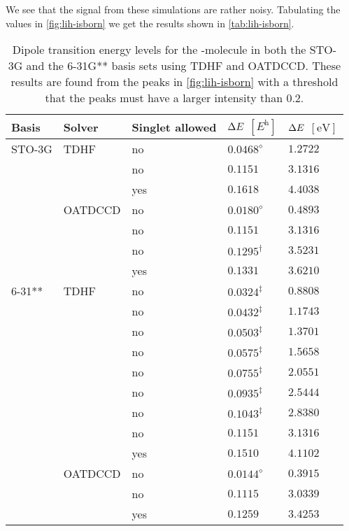         We see that the signal from these simulations are rather noisy.
        Tabulating the values in \autoref{fig:lih-isborn} we get the results
        shown in \autoref{tab:lih-isborn}.
        \begin{table}
            \centering
            \caption{Dipole transition energy levels for the -molecule in
            both the STO-3G and the 6-31G** basis sets using TDHF and OATDCCD.
            These results are found from the peaks in \autoref{fig:lih-isborn}
            with a threshold that the peaks must have a larger intensity than
            $\num{0.2}$.}
            \renewcommand{\arraystretch}{1.3}
            \begin{tabular}{@{}lllll@{}}
                \toprule
                Basis & Solver & Singlet allowed
                & $\Delta E$ $[\si{\hartree}]$
                & $\Delta E$ $[\si{\electronvolt}]$
                \\
                \midrule
                STO-3G & TDHF & no & $0.0468^{\diamond}$ & $1.2722$ \\
                & & no & $0.1151$ & $3.1316$ \\
                & & yes & $0.1618$ & $4.4038$ \\
                & OATDCCD & no & $0.0180^{\diamond}$ & $0.4893$ \\
                & & no & $0.1151$ & $3.1316$ \\
                & & no & $0.1295^{\dagger}$ & $3.5231$ \\
                & & yes & $0.1331$ & $3.6210$ \\
                6-31** & TDHF & no & $0.0324^{\ddagger}$ & $0.8808$ \\
                & & no & $0.0432^{\ddagger}$ & $1.1743$ \\
                & & no & $0.0503^{\ddagger}$ & $1.3701$ \\
                & & no & $0.0575^{\ddagger}$ & $1.5658$ \\
                & & no & $0.0755^{\ddagger}$ & $2.0551$ \\
                & & no & $0.0935^{\ddagger}$ & $2.5444$ \\
                & & no & $0.1043^{\ddagger}$ & $2.8380$ \\
                & & no & $0.1151$ & $3.1316$ \\
                & & yes & $0.1510$ & $4.1102$ \\
                & OATDCCD & no & $0.0144^{\diamond}$ & $0.3915$ \\
                & & no & $0.1115$ & $3.0339$ \\
                & & yes & $0.1259$ & $3.4253$ \\
                \bottomrule
            \end{tabular}
            \label{tab:lih-isborn}
        \end{table}
